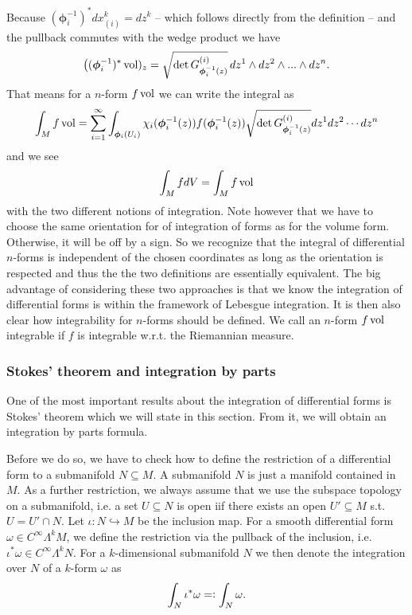 \documentclass[../master_thesis.tex]{subfiles}
\begin{document}
Because $(\boldsymbol{\phi}_i^{-1})^* dx_{(i)}^k = dz^k$ -- which follows directly from the 
definition -- and the pullback commutes with the wedge product we have
\begin{align*}
    \big( (\boldsymbol{\phi}_i^{-1})^* \operatorname{vol})_z =  
        \sqrt{ \det G^{(i)}_{\boldsymbol{\phi}_i^{-1}(z)}} \,
        dz^1 \wedge dz^2 \wedge ... \wedge dz^n.
\end{align*}
That means for a $n$-form $f \operatorname{vol}$ we can write the integral as
\begin{align*}
    \int_M f \operatorname{vol} = \sum_{i=1}^\infty \int_{\boldsymbol{\phi}_i(U_i)} 
    \chi_i(\boldsymbol{\phi}_i^{-1}(z)) f(\boldsymbol{\phi}_i^{-1}(z))
        \sqrt{ \det G^{(i)}_{\boldsymbol{\phi}_i^{-1}(z)}} dz^1 dz^2 \cdots dz^n
\end{align*} 
and we see 
\begin{align*}
    \int_M f dV = \int_M f \operatorname{vol}
\end{align*}
with the two different notions of integration. Note however that we have to choose the 
same orientation for of integration of forms as for the volume form. 
Otherwise, it will be off by a sign.
So we recognize that 
the integral of differential $n$-forms is independent of the chosen 
coordinates as long as the orientation is respected and thus the
the two definitions are essentially equivalent.
The big advantage of considering these two
approaches is that we know the integration of 
differential forms is within the framework of Lebesgue integration. 
It is then also 
clear how integrability for $n$-forms should be defined. We call an 
$n$-form $f \operatorname{vol}$ integrable if $f$ is integrable w.r.t. the Riemannian measure.

\subsubsection{Stokes' theorem and integration by parts} 

One of the most important results about the integration of differential forms
is Stokes' theorem which we will state in this section. From it, we will 
obtain an integration by parts formula.

Before we do so, we have to check how to define the restriction of a
differential form to a submanifold $N \subseteq M$. A submanifold $N$ 
is just a manifold contained in $M$. As a further restriction, we always assume
that we use the subspace topology on a submanifold, i.e. a set $U \subseteq N$ 
is open iif there exists an open $U' \subseteq M$ s.t. $U = U' \cap N$.
Let $\iota: N \hookrightarrow M$ be the inclusion map. For a 
smooth differential form $\omega \in C^\infty \Lambda^k M$, we define 
the restriction via the pullback of the inclusion, i.e. 
$\iota^* \omega \in C^\infty \Lambda^k N$. 
For a $k$-dimensional submanifold $N$ we then denote the integration over $N$ of a 
$k$-form $\omega$ as
\begin{align*}
    \int_N \iota^*\omega =\vcentcolon \int_N \omega.
\end{align*} 
\end{document}
